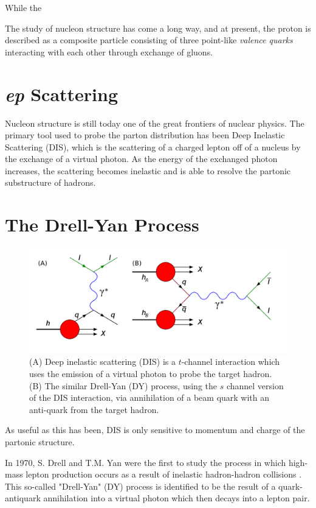 While the 

The study of nucleon structure has come a long way, and at present, the proton 
is described as a composite particle consisting of three point-like \emph{valence quarks}
interacting with each other through exchange of gluons.

\section{\emph{ep} Scattering}

Nucleon structure is still today one of the great frontiers of nuclear physics.  The primary tool used to probe the parton distribution has been Deep Inelastic Scattering (DIS), which is the scattering of a charged lepton off of a nucleus by the exchange of a virtual photon.  As the energy of the exchanged photon increases, the scattering becomes inelastic and is able to resolve the partonic substructure of hadrons.

\section{The Drell-Yan Process}

\begin{figure}[h]
	\centering
	\includegraphics[width=4.50in]{figures/background/DIS-DY.png}
	\caption{(A) Deep inelastic scattering (DIS) is a $t$-channel interaction which uses the emission of a virtual photon to probe the target hadron. (B) The similar Drell-Yan (DY) process, using the $s$ channel version of the DIS interaction, via annihilation of a beam quark with an anti-quark from the target hadron.}
	\label{fig:dis-dy}
\end{figure}

As useful as this has been, DIS is only sensitive to momentum and charge of the partonic structure.

In 1970, S. Drell and T.M. Yan were the first to study the process in which high-mass lepton production occurs as a result of inelastic hadron-hadron collisions \cite{Drell:1970wh}.  This so-called "Drell-Yan" (DY) process is identified to be the result of a quark-antiquark annihilation into a virtual photon which then decays into a lepton pair. 

